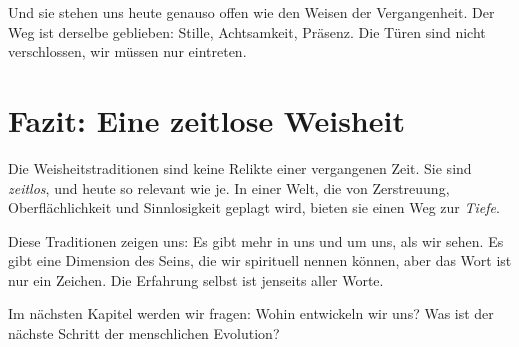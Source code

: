 Und sie stehen uns heute genauso offen wie den Weisen der Vergangenheit. Der Weg ist derselbe geblieben: Stille, Achtsamkeit, Präsenz. Die Türen sind nicht verschlossen, wir müssen nur eintreten.

\section{Fazit: Eine zeitlose Weisheit}

Die Weisheitstraditionen sind keine Relikte einer vergangenen Zeit. Sie sind \emph{zeitlos}, und heute so relevant wie je. In einer Welt, die von Zerstreuung, Oberflächlichkeit und Sinnlosigkeit geplagt wird, bieten sie einen Weg zur \emph{Tiefe}.

Diese Traditionen zeigen uns: Es gibt mehr in uns und um uns, als wir sehen. Es gibt eine Dimension des Seins, die wir \glqq spirituell\grqq{} nennen können, aber das Wort ist nur ein Zeichen. Die Erfahrung selbst ist jenseits aller Worte.

Im nächsten Kapitel werden wir fragen: Wohin entwickeln wir uns? Was ist der nächste Schritt der menschlichen Evolution?
